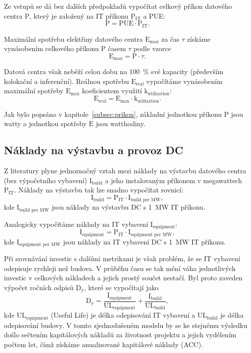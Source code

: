 Ze vstupů se dá bez dalších předpokladů vypočítat celkový příkon datového centra $\text{P}$, který je založený na IT příkonu $\text{P}_\text{IT}$ a PUE:
$$\text{P} = \text{PUE} \cdot \text{P}_\text{IT}.$$

Maximální spotřebu elektřiny datového centra $\text{E}_\text{max}$ za čas $\tau$ získáme vynásobením celkového příkonu $\text{P}$ časem $\tau$ podle vzorce
$$\text{E}_\text{max} = \text{P} \cdot \tau.$$

Datová centra však neběží celou dobu na 100~\% své kapacity (především kolokační a inferenční). Reálnou spotřebu $\text{E}_\text{real}$ vypočítáme vynásobením maximální spotřeby $\text{E}_\text{max}$ koeficientem využití $\text{k}_\text{utilization}$:
$$\text{E}_\text{real} = \text{E}_\text{max} \cdot \text{k}_\text{utilization}.$$

Jak bylo popsáno v kapitole~\ref{subsec:prikon}, základní jednotkou příkonu $\text{P}$ jsou watty a jednotkou spotřeby $\text{E}$ jsou watthodiny.

\subsection{Náklady na výstavbu a provoz DC}
\label{subsec:model_naklady}

Z literatury plyne jednoznačný vztah mezi náklady na výstavbu datového centra (bez výpočetního vybavení) $\text{I}_\text{build}$ a jeho instalovaným příkonem v megawattech $\text{P}_\text{IT}$. Náklady na výstavbu tak lze snadno vypočítat rovnicí:
$$\text{I}_\text{build} = \text{P}_\text{IT} \cdot \text{I}_\text{build per MW},$$
kde $\text{I}_\text{build per MW}$ jsou náklady na výstavbu DC s 1~MW IT příkonu.

Analogicky vypočítáme náklady na IT vybavení $\text{I}_\text{equipment}$:
$$\text{I}_\text{equipment} = \text{P}_\text{IT} \cdot \text{I}_\text{equipment per MW},$$
kde $\text{I}_\text{equipment per MW}$ jsou náklady na IT vybavení DC s 1~MW IT příkonu.

Při srovnávání investic s dalšími metrikami je však problém, že se IT vybavení odepisuje rychleji než budova. V průběhu času se tak mění váha jednotlivých investic v celkových nákladech a jejich prostý součet nestačí. Byl proto zaveden výpočet ročních odpisů $\text{D}_\text{y}$, které se vypočítají jako
$$\text{D}_\text{y} = \frac{\text{I}_\text{equipment}}{\text{UL}_\text{equipment}} + \frac{\text{I}_\text{build}}{\text{UL}_\text{build}},$$
kde $\text{UL}_\text{equipment}$ (Useful Life) je délka odepisování IT vybavení a $\text{UL}_\text{build}$ je délka odepisování budovy. V tomto zjednodušeném modelu by se ke stejnému výsledku došlo sečtením kapitálových nákladů za životnost projektu a jejich vydělením počtem let, čímž získáme anualizované kapitálové náklady (ACC).

